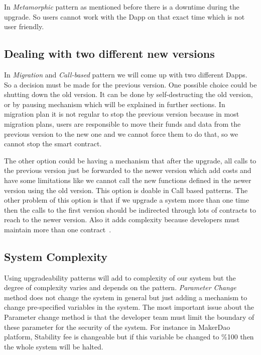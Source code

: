 In \textit{Metamorphic} pattern as mentioned before there is a downtime during the upgrade. So users cannot work with the Dapp on that exact time which is not user friendly.

\subsection{Dealing with two different new versions}
In \textit{Migration} and \textit{Call-based} pattern we will come up with two different Dapps. So a decision must be made for the previous version. One possible choice could be shutting down the old version. It can be done by self-destructing the old version, or by pausing mechanism which will be explained in further sections. In migration plan it is not regular to stop the previous version because in most migration plans, users are responsible to move their funds and data from the previous version to the new one and we cannot force them to do that, so we cannot stop the smart contract. 

The other option could be having a mechanism that after the upgrade, all calls to the previous version just be forwarded to the newer version which add costs and have some limitations like we cannot call the new functions defined in the newer version using the old version. This option is doable in Call based patterns. The other problem of this option is that if we upgrade a system more than one time then the calls to the first version should be indirected through lots of contracts to reach to the newer version. Also it adds complexity because developers must maintain more than one contract~\cite{ToBantiPattern}.


 \subsection{System Complexity} \label{sysComplexity}

 Using upgradeability patterns will add to complexity of our system but the degree of complexity varies and depends on the pattern. 
\textit{Parameter Change} method does not change the system in general but just adding a mechanism to change pre-specified variables in the system. The most important issue about the Parameter change method is that the developer team must limit the boundary of these parameter for the security of the system. For instance in MakerDao platform, Stability fee is changeable but if this variable be changed to \%100 then the whole system will be halted.

